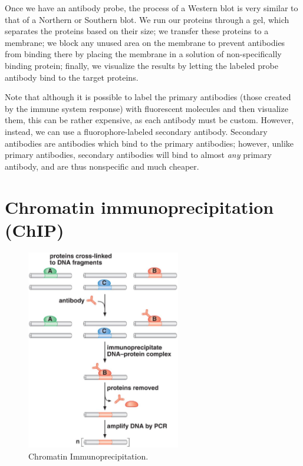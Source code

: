 \documentclass{article}
\begin{document}
Once we have an antibody probe, the process of a Western blot is very similar to that of a Northern
or Southern blot. We run our proteins through a gel, which separates the proteins based on their
size; we transfer these proteins to a membrane; we block any unused area on the membrane to prevent
antibodies from binding there by placing the membrane in a solution of non-specifically binding
protein; finally, we visualize the results by letting the labeled probe antibody bind to the target
proteins. 

Note that although it is possible to label the primary antibodies (those created by the immune
system response) with fluorescent molecules and then visualize them, this can be rather expensive,
as each antibody must be custom. However, instead, we can use a fluorophore-labeled secondary
antibody. Secondary antibodies are antibodies which bind to the primary antibodies; however, unlike
primary antibodies, secondary antibodies will bind to almost \emph{any} primary antibody, and are
thus nonspecific and much cheaper.

\section*{Chromatin immunoprecipitation (ChIP)}

\begin{figure}[h!]
    \begin{center}
        \includegraphics[width=0.6\textwidth]{images/chip.png}
    \end{center}
    \caption{
        Chromatin Immunoprecipitation.
    }
\end{figure}
\end{document}
